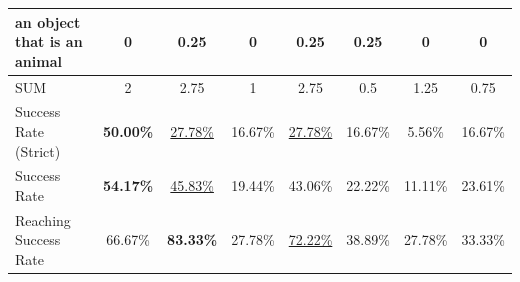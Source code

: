 \documentclass{article} %
\begin{document}
\begin{table}[h]
{\begin{tabular}{l|cc|ccc|c|c}
an object that is an animal & 0 & 0.25 & 0 & 0.25 & 0.25 & 0 & 0 \\
\midrule
SUM & 2 & 2.75 & 1 & 2.75 & 0.5 & 1.25 & 0.75 \\
\midrule
Success Rate (Strict) & \textbf{50.00\%} & \underline{27.78\%} & 16.67\% & \underline{27.78\%} & 16.67\% & 5.56\% & 16.67\% \\
Success Rate & \textbf{54.17\%} & \underline{45.83\%} & 19.44\% & 43.06\% & 22.22\% & 11.11\% & 23.61\% \\
Reaching Success Rate & 66.67\% & \textbf{83.33\%} & 27.78\% & \underline{72.22\%} & 38.89\% & 27.78\% & 33.33\% \\
\bottomrule
\end{tabular}%
}
\label{tab:realresultdetail3}
\end{table}

\begin{table}[h]
\centering
\caption{\textbf{Summary of Total Success Rates (\%)}}
\label{tab:realresultdetail4}
\end{table}
\end{document}
